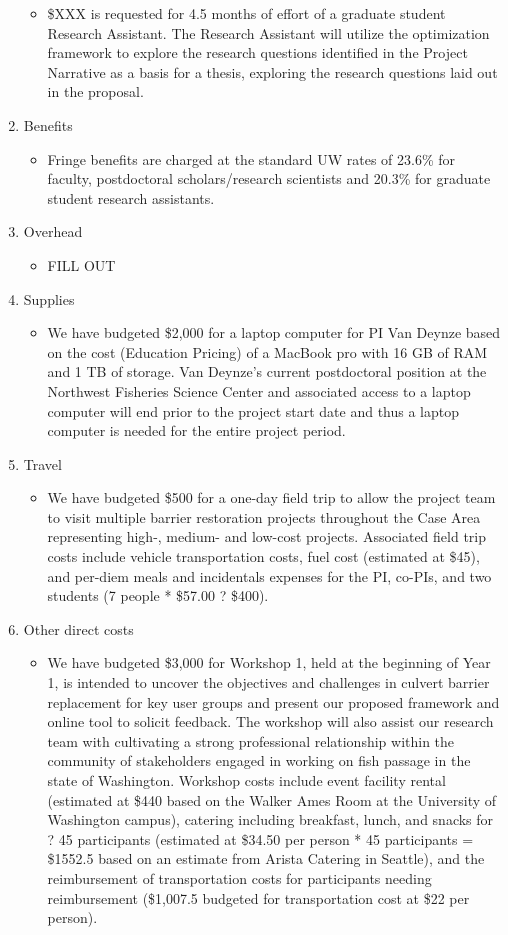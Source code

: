 \begin{enumerate}
\begin{itemize}
\item \$XXX is requested for 4.5 months of effort of a graduate student Research Assistant. The Research Assistant will utilize the optimization framework to explore the research questions identified in the Project Narrative as a basis for a thesis, exploring the research questions laid out in the proposal.
\end{itemize}
\item Benefits
\begin{itemize}
\item Fringe benefits are charged at the standard UW rates of 23.6\% for faculty, postdoctoral scholars/research scientists and 20.3\% for graduate student research assistants. 
\end{itemize}
\item Overhead
\begin{itemize}
\item FILL OUT
\end{itemize}
\item Supplies
\begin{itemize}
\item We have budgeted \$2,000 for a laptop computer for PI Van Deynze based on the cost (Education Pricing) of a MacBook pro with 16 GB of RAM and 1 TB of storage. Van Deynze's current postdoctoral position at the Northwest Fisheries Science Center and associated access to a laptop computer will end prior to the project start date and thus a laptop computer is needed for the entire project period.
\end{itemize}
\item Travel
\begin{itemize}
\item We have budgeted \$500 for a one-day field trip to allow the project team to visit multiple barrier restoration projects throughout the Case Area representing high-, medium- and low-cost projects. Associated field trip costs include vehicle transportation costs, fuel cost (estimated at \$45), and per-diem meals and incidentals expenses for the PI, co-PIs, and two students (7 people * \$57.00 ? \$400).
\end{itemize}
\item Other direct costs
\begin{itemize}
\item We have budgeted \$3,000 for Workshop 1, held at the beginning of Year 1, is intended to uncover the objectives and challenges in culvert barrier replacement for key user groups and present our proposed framework and online tool to solicit feedback. The workshop will also assist our research team with cultivating a strong professional relationship within the community of stakeholders engaged in working on fish passage in the state of Washington. Workshop costs include event facility rental (estimated at \$440 based on the Walker Ames Room at the University of Washington campus), catering including breakfast, lunch, and snacks for ? 45 participants (estimated at \$34.50 per person * 45 participants = \$1552.5 based on an estimate from Arista Catering in Seattle), and the reimbursement of transportation costs for participants needing reimbursement (\$1,007.5 budgeted for transportation cost at \$22 per person).

\end{itemize}
\end{enumerate}

